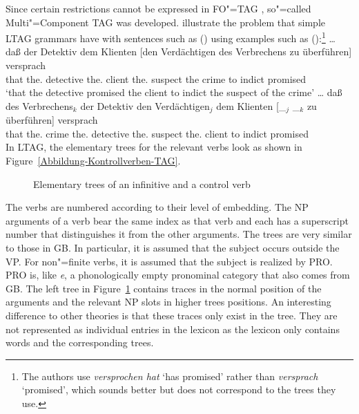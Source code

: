 Since certain restrictions cannot be expressed in FO"=TAG \citep[--50]{Rambow94a}, so"=called Multi"=Component TAG was developed.
\citet*{JBR2000a} illustrate the problem that simple LTAG grammars have with sentences such as () using examples such as ():\footnote{
  The authors use \emph{versprochen hat} `has promised' rather than \emph{versprach} `promised', which sounds better but does not correspond
  to the trees they use.
}
\eal
\ex 
\gll \ldots{} daß  der        Detektiv  dem        Klienten [den Verdächtigen des Verbrechens zu überführen] versprach\\
         {}   that the.\nom{} detective the.\dat{} client   \spacebr{}the.\acc{} suspect the\gen{} crime to indict promised\\
  \glt `that the detective promised the client to indict the suspect of the crime'
\ex\label{Beispiel-Joshi-NP4} 
\gll \ldots{} daß  des        Verbrechens$_k$ der        Detektiv  den Verdächtigen$_j$ dem         Klienten [\_$_j$ \_$_k$ zu überführen] versprach\\
      {}      that the.\gen{} crime           the.\nom{} detective the.\acc{} suspect   the.\dat{}  client   {}      {}     to indict      promised\\
\zl
In LTAG, the elementary trees for the relevant verbs look as shown in Figure~\vref{Abbildung-Kontrollverben-TAG}.
\begin{figure}
\caption{\label{Abbildung-Kontrollverben-TAG}Elementary trees of an infinitive and a control verb} 
\end{figure}%
The verbs are numbered according to their level of embedding. The NP arguments of a verb bear the same index as that verb
and each has a superscript number that distinguishes it from the other arguments.
The trees are very similar to those in GB\indexgb. In particular, it is assumed that the subject occurs outside the VP.
For non"=finite verbs, it is assumed that the subject is realized by PRO. PRO is, like \emph{e}, a phonologically empty pronominal
category that also comes from GB.
The left tree in Figure~\ref{Abbildung-Kontrollverben-TAG} contains traces in the normal position of the arguments and the relevant
NP slots in higher trees positions. An interesting difference to other theories is that these traces only exist in the tree. They are not
represented as individual entries in the lexicon as the lexicon only contains words and the corresponding trees.

